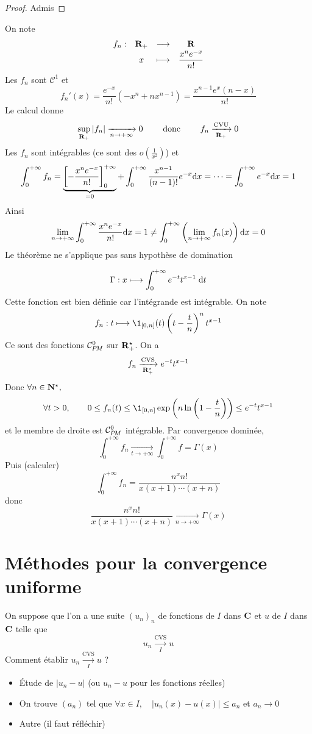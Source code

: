 \begin{proof}
Admis
\end{proof}

\begin{rem}
On note \[
\begin{matrix}
    f_n:& \mathbf R_+ & \longrightarrow &\mathbf R  \\
    & x & \longmapsto & \dfrac{x^ne^{-x}}{n!}
\end{matrix}
\] 
Les $f_n$ sont  $\mathcal  C^1$ et \[
    f_n'(x)=\frac{e^{-x}}{n!}\left( -x^n+nx^{n-1} \right) =\frac{x^{n-1}e^x(n-x)}{n!}
\] 
Le calcul donne \[
    \sup_{\mathbf R_+}|f_n| \xrightarrow[n\to+\infty]{}0 \qquad  \text{ donc } \qquad  f_n \xrightarrow[\mathbf R_+]{\text{CVU}}0
\]
Les $f_n$ sont intégrables (ce sont des $o(\frac{1}{x^2})$) et \[
    \int_0^{+\infty}f_n= \underbrace{\left[ -\frac{x^ne^{-x}}{n!} \right]_0^{+\infty}}_{=0}+\int_0^{+\infty} \frac{x^{n-1}}{(n-1)!}e^{-x}\mathrm{d} x=\cdots =\int_0^{+\infty}e^{-x}\mathrm{d} x=1
\]
Ainsi  \[
    \lim_{n\to +\infty} \int_0^{+\infty} \frac{x^ne^{-x}}{n!}\mathrm{d} x=1 \neq  \int_0^{+\infty} \left( \lim_{n\to +\infty}f_n(x) \right) \mathrm{d} x=0
\] 
Le théorème ne s'applique pas sans hypothèse de domination
\end{rem}

\begin{ex}
\[
\Gamma:x\longmapsto \int_{{0}}^{{+\infty}} {e^{-t}t^{x-1}}\;\mathrm{d} t
\] 
Cette fonction est bien définie car l'intégrande est intégrable. On note \[
    f_n:t\longmapsto \1_{[0,n]}(t) \left( t-\frac{t}{n} \right) ^nt^{x-1}
\]
Ce sont des fonctions $\CPM$ sur  $\mathbf R_+^\star$. On a \[
    f_n \xrightarrow[\mathbf R_+^\star]{\text{CVS}}e^{-t}t^{x-1}
\]
Donc $\forall  n \in  \mathbf N^\star,$ \[ \forall  t >0, \qquad  0\leq f_n(t)\leq \1_{[0, n]}\exp\left(n \ln \left(1-\frac{t}{n}\right)\right)\leq e^{-t}t^{x-1} \]
et le membre de droite est $\CPM$ intégrable. Par convergence dominée,  \[
    \int_{0}^{+\infty} f_n \xrightarrow[t\to +\infty]{}\int_0^{+\infty}f=\Gamma(x) 
\] 
Puis (calculer) \[
    \int_0^{+\infty}f_n=\frac{n^xn!}{x(x+1)\cdots (x+n)}
\] 
donc \[
    \frac{n^xn!}{x(x+1)\cdots (x+n)} \xrightarrow[n\to+\infty]{}\Gamma(x)
\] 
\end{ex}

\section{Méthodes pour la convergence uniforme}

On suppose que l'on a une suite $(u_n)_n$ de fonctions de  $I$ dans  $\mathbf C$ et $u$ de  $I$ dans  $\mathbf C$ telle que \[
    u_n \xrightarrow[I]{\text{CVS}}u
\]
Comment établir $u_n \xrightarrow[I]{\text{CVS}}u$ ?
\begin{itemize}
    \item Étude de $|u_n-u|$ (ou $u_n-u$ pour les fonctions réelles)
    \item On trouve $(a_n)$ tel que  $\forall  x \in  I, \quad  |u_n(x)-u(x)|\leq a_n$ et $a_n\longrightarrow 0$
    \item Autre (il faut réfléchir)
\end{itemize}

